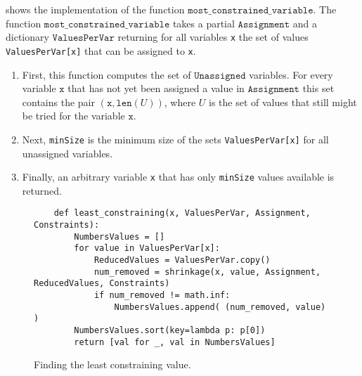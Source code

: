  shows the implementation of the function
$\texttt{most\_constrained\_variable}$.  The function $\texttt{most\_constrained\_variable}$ takes a partial 
$\texttt{Assignment}$ and a dictionary $\texttt{ValuesPerVar}$ returning for all variables \texttt{x} the set
of values \texttt{ValuesPerVar[x]} that can be assigned to \texttt{x}.
\begin{enumerate}
\item First, this function computes the set of $\texttt{Unassigned}$ variables.  For every variable $\texttt{x}$ that
      has not yet been assigned a value in $\texttt{Assignment}$ this set contains the pair 
      $(\texttt{x}, \texttt{len}(U))$, where $U$ is the set of values that still might be tried for the variable  $\texttt{x}$.
\item Next, \texttt{minSize} is the minimum size of the sets \texttt{ValuesPerVar[x]} for all unassigned variables.
\item Finally, an arbitrary variable \texttt{x} that has only \texttt{minSize} values available is returned.
\end{enumerate}

\begin{figure}[!ht]
\centering
\begin{verbatim}
    def least_constraining(x, ValuesPerVar, Assignment, Constraints):
        NumbersValues = []
        for value in ValuesPerVar[x]:
            ReducedValues = ValuesPerVar.copy()
            num_removed = shrinkage(x, value, Assignment, ReducedValues, Constraints)
            if num_removed != math.inf:
                NumbersValues.append( (num_removed, value) )
        NumbersValues.sort(key=lambda p: p[0])
        return [val for _, val in NumbersValues]\end{verbatim}
\vspace*{-0.3cm}
\caption{Finding the least constraining value.}
\label{fig:Constraint-Propagation-Solver.ipynb:least_constraining}
\end{figure} 

